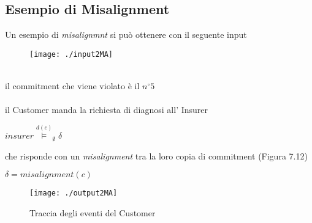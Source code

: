 \documentclass[a4paper,12pt]{report}
\begin{document}
\subsection{Esempio di Misalignment}
Un esempio di \textit{misalignmnt} si può ottenere con il seguente input
\begin{figure}[h]
    \texttt{[image: ./input2MA]}
\end{figure}
\\il commitment che viene violato è il $n^{\circ}5$\\
\\
il Customer manda la richiesta di diagnosi all' Insurer
\begin{center}
    \textit{$insurer\stackrel{d(c)}{\models}_{\emptyset} \delta$}
\end{center}
che risponde con un \textit{misalignment} tra la loro copia di commitment (Figura 7.12)
\begin{center}
    \textit{$\delta = misalignment(c)$}
\end{center}
\begin{figure}[h]
    \texttt{[image: ./output2MA]}
    \caption{Traccia degli eventi del Customer}
\end{figure}
\newpage
\end{document}
